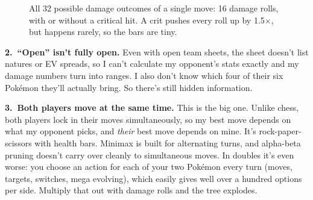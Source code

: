 \documentclass[11pt,a4paper]{article}
\begin{document}
\begin{figure}[h]
\centering
{}
\caption{All 32 possible damage outcomes of a single move: 16 damage rolls, with or without a critical hit. A crit pushes every roll up by 1.5$\times$, but happens rarely, so the bars are tiny.}
\label{fig:dmg}
\end{figure}

\textbf{2.\ ``Open'' isn't fully open.} Even with open team sheets, the sheet doesn't list natures or EV spreads, so I can't calculate my opponent's stats exactly and my damage numbers turn into ranges. I also don't know which four of their six Pok\'emon they'll actually bring. So there's still hidden information.

\textbf{3.\ Both players move at the same time.} This is the big one. Unlike chess, both players lock in their moves simultaneously, so my best move depends on what my opponent picks, and \emph{their} best move depends on mine. It's rock-paper-scissors with health bars. Minimax is built for alternating turns, and alpha-beta pruning doesn't carry over cleanly to simultaneous moves. In doubles it's even worse: you choose an action for each of your two Pok\'emon every turn (moves, targets, switches, mega evolving), which easily gives well over a hundred options per side. Multiply that out with damage rolls and the tree explodes.
\end{document}
